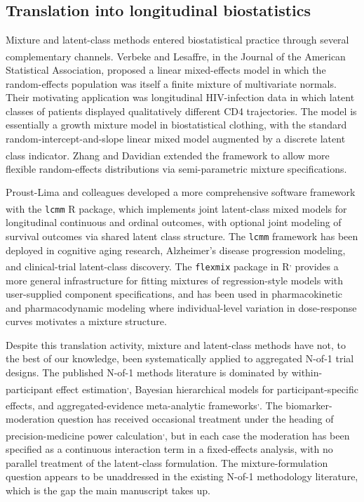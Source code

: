 \documentclass[
  11pt,
]{article}
\begin{document}
\subsection{Translation into longitudinal biostatistics}\label{translation-into-longitudinal-biostatistics}

Mixture and latent-class methods entered biostatistical practice
through several complementary channels. Verbeke and Lesaffre\textsuperscript{}, in the Journal of the American Statistical
Association, proposed a linear mixed-effects model in which the
random-effects population was itself a finite mixture of multivariate
normals. Their motivating application was longitudinal HIV-infection
data in which latent classes of patients displayed qualitatively
different CD4 trajectories. The model is essentially a growth mixture
model in biostatistical clothing, with the standard
random-intercept-and-slope linear mixed model augmented by a discrete
latent class indicator. Zhang and Davidian\textsuperscript{}
extended the framework to allow more flexible random-effects
distributions via semi-parametric mixture specifications.

Proust-Lima and colleagues developed a more comprehensive software
framework with the \texttt{lcmm} R package\textsuperscript{}, which
implements joint latent-class mixed models for longitudinal continuous
and ordinal outcomes, with optional joint modeling of survival
outcomes via shared latent class structure. The \texttt{lcmm}
framework has been deployed in cognitive aging research, Alzheimer's
disease progression modeling, and clinical-trial latent-class
discovery. The \texttt{flexmix} package in R\textsuperscript{,} provides a more general infrastructure for fitting
mixtures of regression-style models with user-supplied component
specifications, and has been used in pharmacokinetic and
pharmacodynamic modeling where individual-level variation in
dose-response curves motivates a mixture structure.

Despite this translation activity, mixture and latent-class methods
have not, to the best of our knowledge, been systematically applied to
aggregated N-of-1 trial designs. The published N-of-1 methods
literature is dominated by within-participant effect estimation\textsuperscript{,}, Bayesian hierarchical models for
participant-specific effects\textsuperscript{}, and aggregated-evidence
meta-analytic frameworks\textsuperscript{,}. The
biomarker-moderation question has received occasional treatment under
the heading of precision-medicine power calculation\textsuperscript{,}, but in each case the moderation has been specified
as a continuous interaction term in a fixed-effects analysis, with no
parallel treatment of the latent-class formulation. The
mixture-formulation question appears to be unaddressed in the existing
N-of-1 methodology literature, which is the gap the main manuscript
takes up.
\end{document}
